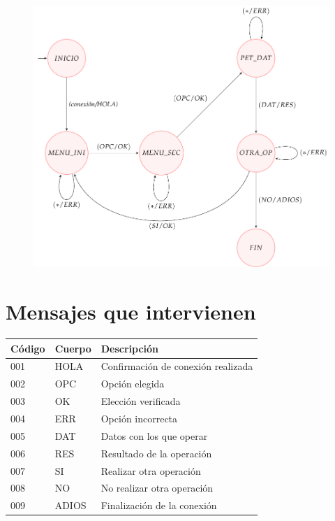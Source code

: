 \documentclass[a4paper, 11pt]{article}
\theoremstyle{plain}
\begin{document}
\begin{figure}[!h]
	\centering
	\includegraphics[scale=0.7]{./Img/diagrama}
\end{figure}

\section{Mensajes que intervienen}

\begin{table}[h]
\centering
\label{my-label}
\begin{tabular}{lll}
\hline
\multicolumn{1}{|l|}{Código} & \multicolumn{1}{l|}{Cuerpo} & \multicolumn{1}{l|}{Descripción}   \\ \hline
001                          & HOLA                        & Confirmación de conexión realizada \\
002                          & OPC                         & Opción elegida                     \\
003                          & OK                          & Elección verificada                \\
004                          & ERR                         & Opción incorrecta                  \\
005                          & DAT                         & Datos con los que operar           \\
006                          & RES                         & Resultado de la operación          \\
007                          & SI                          & Realizar otra operación            \\
008                          & NO                          & No realizar otra operación         \\
009                          & ADIOS                       & Finalización de la conexión       
\end{tabular}
\end{table}
\end{document}
